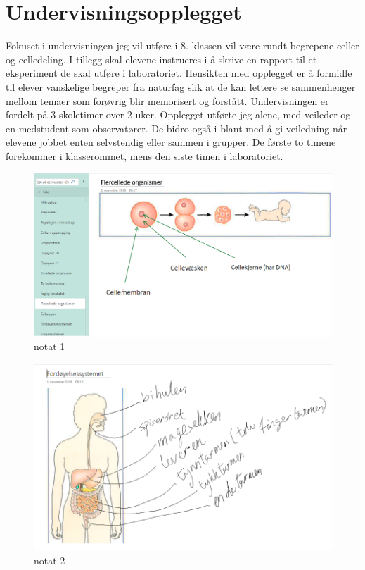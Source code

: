 \documentclass[main.tex]{subfiles}
\begin{document}
\section*{Undervisningsopplegget}
\label{sec:1}
Fokuset i undervisningen jeg vil utføre i 8. klassen vil være rundt begrepene celler og celledeling. 
I tillegg skal elevene instrueres i å skrive en rapport til et eksperiment de skal utføre i laboratoriet.
Hensikten med opplegget er å formidle til elever vanskelige begreper fra naturfag slik at de kan lettere 
se sammenhenger mellom temaer som forøvrig blir memorisert og forstått. Undervisningen er fordelt på 
3 skoletimer over 2 uker. Opplegget utførte jeg alene, med veileder og en medstudent som observatører. 
De bidro også i blant med å gi veiledning når elevene jobbet enten selvstendig eller sammen i grupper. 
De første to timene forekommer i klasserommet, mens den siste timen i laboratoriet.

\begin{figure}[h!]
\includegraphics[scale = 0.6]{../figures/onenote_flercellet.png}
\caption{notat 1}
\label{fig:notat1}
\end{figure}

\begin{figure}[h!]
\includegraphics[scale = 0.6]{../figures/onenote_fordoyelse.png}
\caption{notat 2}
\label{fig:notat2}
\end{figure}
\end{document}
